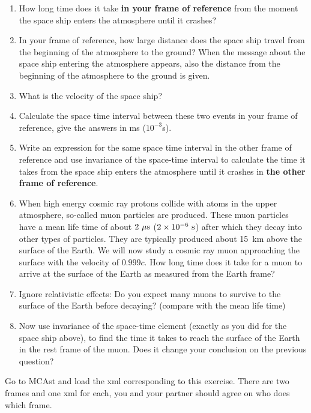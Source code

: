 {\begin{multicols}{2}
\begin{enumerate}
\item How long time does it take {\bf in your frame of reference} from the moment the space ship enters the atmosphere until it crashes?
\item In your frame of reference, how large distance does the space ship travel from the beginning of the atmosphere to the ground? When the message about the space ship entering the atmosphere appears, also the distance from the beginning of the atmosphere to the ground is given.
\item What is the velocity of the space ship?
\item Calculate the space time interval between these two events in your frame of reference, give the answers in ms ($10^{-3}$s).
\item Write an expression for the same space time interval in the other frame of reference and use invariance of the space-time interval to calculate the time it takes from the space ship enters the atmosphere until it crashes in {\bf the other frame of reference}.
\item  When high energy cosmic ray protons collide with atoms in the upper atmosphere, so-called muon particles are produced. These muon particles have a mean life time of about $2 {\rm \ \mu s}$ ($2\times10^{-6} {\rm \ s}$) after which they decay into other types of particles. They are typically produced about 15~km above the surface of the Earth. We will now study a cosmic ray muon approaching the surface with the velocity of $0.999c$. How long time does it take for a muon to arrive at the surface of the Earth as measured from the Earth frame?
\item Ignore relativistic effects: Do you expect many muons to survive to the surface of the Earth before decaying? (compare with the mean life time)
\item Now use invariance of the space-time element (exactly as you did for the space ship above), to find the time it takes to reach the surface of the Earth in the rest frame of the muon. Does it change your conclusion on the previous question?
\end{enumerate}

\vspace{0.5cm}



Go to MCAst and load the xml corresponding to this exercise. There are two frames and one xml for each, you and your partner should agree on who does which frame.


\end{multicols}}
